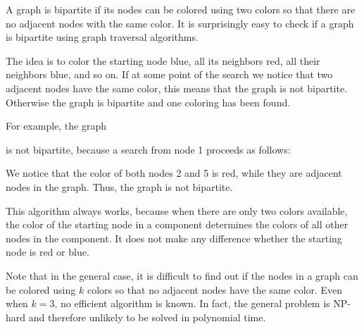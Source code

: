 
A graph is bipartite if its nodes can be colored
using two colors so that there are no adjacent
nodes with the same color.
It is surprisingly easy to check if a graph
is bipartite using graph traversal algorithms.

The idea is to color the starting node blue,
all its neighbors red, all their neighbors blue, and so on.
If at some point of the search we notice that
two adjacent nodes have the same color,
this means that the graph is not bipartite.
Otherwise the graph is bipartite and one coloring
has been found.

For example, the graph
\begin{center}
\end{center}
is not bipartite, because a search from node 1
proceeds as follows:
\begin{center}
\end{center}
We notice that the color of both nodes 2 and 5
is red, while they are adjacent nodes in the graph.
Thus, the graph is not bipartite.

This algorithm always works, because when there
are only two colors available,
the color of the starting node in a component
determines the colors of all other nodes in the component.
It does not make any difference whether the
starting node is red or blue.

Note that in the general case,
it is difficult to find out if the nodes
in a graph can be colored using $k$ colors
so that no adjacent nodes have the same color.
Even when $k=3$, no efficient algorithm is known.
In fact, the general problem is NP-hard and
therefore unlikely to be solved in polynomial time.
